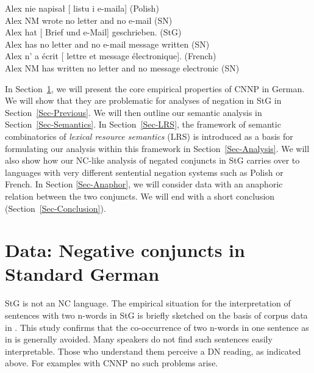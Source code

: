 \documentclass[output=paper]{langsci/langscibook}
\begin{document}
\ea \label{ex-conj-pl}
\gll Alex nie napisał [ listu
i  e-maila]
(Polish)\\
Alex NM wrote \hphantom{[}no letter and \hphantom{[}no e-mail (SN)\\
\glt {}
\ex \label{ex-conj-de}
\gll Alex hat [ Brief und  e-Mail] geschrieben. (StG)\\
Alex has \hphantom{[}no letter and \hphantom{[}no {e-mail message} written (SN)\\
\ex \label{ex-conj-fr}
\gll Alex n' a écrit [ lettre et  message électronique]. (French)\\
Alex NM has written \hphantom{[}no letter and \hphantom{[}no message electronic (SN)\\
\z 

In Section~\ref{Sec-Data}, we will present the core empirical properties of CNNP in German. We will show that they are problematic for analyses of negation in StG in Section~\ref{Sec-Previous}. We will then
outline our semantic analysis in Section~\ref{Sec-Semantics}. In Section~\ref{Sec-LRS}, the framework of semantic combinatorics of \emph{lexical resource semantics} (LRS) is introduced as a basis for formulating our analysis within this framework in Section~\ref{Sec-Analysis}. 
We will also show how our NC-like analysis of negated conjuncts in StG carries over to languages with very different sentential negation systems such as Polish or French.
In Section \ref{Sec-Anaphor}, we will consider data with an anaphoric relation between the two conjuncts.
We will end with a short conclusion (Section~\ref{Sec-Conclusion}).

\section{Data: Negative conjuncts in Standard German}\label{Sec-Data}\largerpage[2]

StG is not an NC language. 
The empirical situation for the interpretation of sentences with two n-words in StG is briefly sketched on the basis of corpus data in \citet[242--245]{Sailer:18}.
This study confirms that the co-occurrence of two n-words in one sentence as in  is generally avoided. %
Many speakers do not find such sentences easily interpretable. 
Those who understand them perceive a DN reading, as indicated above.
For examples with CNNP no such problems arise.
\end{document}
